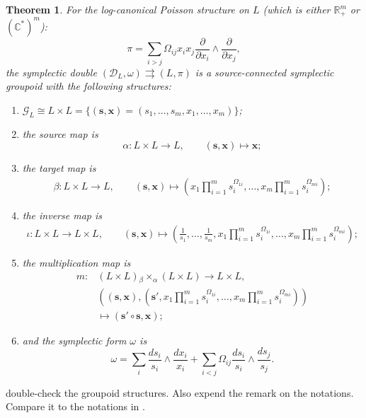 \documentclass{amsart}
\newtheorem{theorem}{Theorem}[section]
\newcommand{\bfs}{\mathbf{s}}
\newcommand{\bfx}{\mathbf{x}}
\newcommand{\cD}{\mathcal{D}}
\newcommand{\cG}{\mathcal{G}}
\newcommand{\CC}{\mathbb{C}}
\newcommand{\RR}{\mathbb{R}}
\newcommand{\rra}{\rightrightarrows}
\begin{document}
\begin{theorem} \cite{MR2470108}
For the log-canonical Poisson structure on $L$ (which is either $\RR_+^m$ or $(\CC^*)^m$):
$$
	\pi = \sum_{i > j} \Omega_{ij} x_i x_j\frac{\partial}{\partial x_i} \wedge \frac{\partial}{\partial x_j},
$$
the symplectic double $(\cD_L, \omega) \rra (L, \pi)$ is a source-connected symplectic groupoid with the following structures:
	\begin{enumerate}
		\item $\cG_L \cong L \times L = \{(\bfs, \bfx) = (s_1, \ldots, s_m, x_1, \ldots, x_m)\}$;
		\item the source map is
			$$
				\alpha: L \times L \to L, \qquad (\bfs, \bfx) \mapsto \bfx;
			$$
		\item the target map is
			$$
				\begin{aligned}
				\beta:  L \times L \to L, \qquad (\bfs, \bfx) \mapsto \left(x_1 \prod_{i=1}^m s_i^{\Omega_{1i}}, \ldots, x_m \prod_{i=1}^m s_i^{\Omega_{mi}}\right);
				\end{aligned}
			$$
		\item the inverse map is
			$$
				\begin{aligned}
				\iota:  L \times L \to L \times L, \qquad (\bfs, \bfx) \mapsto \left(\frac{1}{s_1}, \ldots, \frac{1}{s_m}, x_1 \prod_{i=1}^m s_i^{\Omega_{1i}}, \ldots, x_m \prod_{i=1}^m s_i^{\Omega_{mi}}\right);
				\end{aligned}
			$$
		\item the multiplication map is
			$$
				\begin{aligned}
				m: & \left(L \times L\right) {_\beta \times_\alpha} \left(L \times L\right) \to L \times L, \\
				& \left((\bfs, \bfx), \left(\bfs', x_1 \prod_{i=1}^m s_i^{\Omega_{1i}}, \ldots, x_m \prod_{i=1}^m s_i^{\Omega_{mi}}\right)\right) \\
				& \mapsto (\bfs' \circ \bfs, \bfx );
				\end{aligned}
			$$
		\item and the symplectic form $\omega$ is
		$$
			\omega = \sum_{i} \frac{d s_i}{s_i} \wedge \frac{d x_i}{x_i} + \sum_{i < j} \Omega_{ij} \frac{d s_i}{s_i} \wedge \frac{d s_j}{s_j}.
		$$
	\end{enumerate}
\end{theorem}

{\color{red} double-check the groupoid structures. Also expend the remark on the notations. Compare it to the notations in \cite{MR2470108}.}
\end{document}

